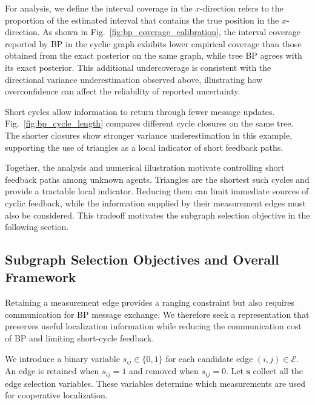 {For analysis, we define the interval coverage in the $x$-direction refers to the proportion of the estimated interval that contains the true position in the $x$-direction. As shown in Fig.~\ref{fig:bp_coverage_calibration}, the interval coverage reported by BP in the cyclic graph exhibits lower empirical coverage than those obtained from the exact posterior on the same graph, while tree BP agrees with its exact posterior. This additional undercoverage is consistent with the directional variance underestimation observed above, illustrating how overconfidence can affect the reliability of reported uncertainty.

Short cycles allow information to return through fewer message updates. Fig.~\ref{fig:bp_cycle_length} compares different cycle closures on the same tree. The shorter closures show stronger variance underestimation in this example, supporting the use of triangles as a local indicator of short feedback paths.

Together, the analysis and numerical illustration motivate controlling short feedback paths among unknown agents. Triangles are the shortest such cycles and provide a tractable local indicator. Reducing them can limit immediate sources of cyclic feedback, while the information supplied by their measurement edges must also be considered. This tradeoff motivates the subgraph selection objective in the following section.

}

\subsection{Subgraph Selection Objectives and Overall Framework}
\label{sec:graph_selection}

Retaining a measurement edge provides a ranging constraint but also requires communication for BP message exchange. We therefore seek a representation that preserves useful localization information while reducing the communication cost of BP and limiting short-cycle feedback.

We introduce a binary variable $s_{ij}\in\{0,1\}$ for each candidate edge $(i,j)\in\mathcal{E}$. An edge is retained when $s_{ij}=1$ and removed when $s_{ij}=0$. Let $\mathbf{s}$ collect all the edge selection variables. These variables determine which measurements are used for cooperative localization.

